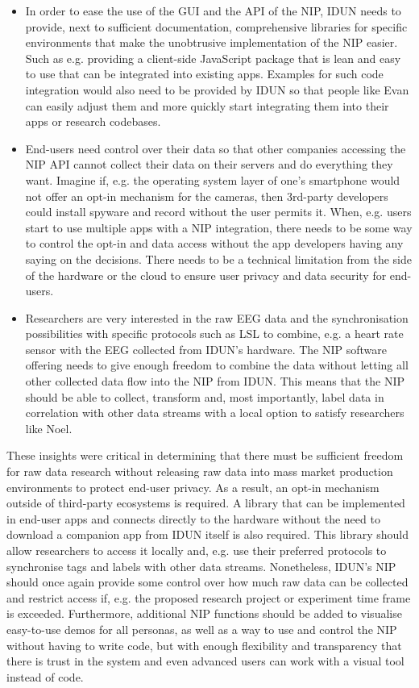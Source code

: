 \begin{itemize}
  \item In order to ease the use of the GUI and the API of the NIP, IDUN needs to provide, next to sufficient documentation, comprehensive libraries for specific environments that make the unobtrusive implementation of the NIP easier. Such as e.g. providing a client-side JavaScript package that is lean and easy to use that can be integrated into existing apps. Examples for such code integration would also need to be provided by IDUN so that people like Evan can easily adjust them and more quickly start integrating them into their apps or research codebases.
  \item End-users need control over their data so that other companies accessing the NIP API cannot collect their data on their servers and do everything they want. Imagine if, e.g. the operating system layer of one's smartphone would not offer an opt-in mechanism for the cameras, then 3rd-party developers could install spyware and record without the user permits it. When, e.g. users start to use multiple apps with a NIP integration, there needs to be some way to control the opt-in and data access without the app developers having any saying on the decisions. There needs to be a technical limitation from the side of the hardware or the cloud to ensure user privacy and data security for end-users.
  \item Researchers are very interested in the raw EEG data and the synchronisation possibilities with specific protocols such as LSL to combine, e.g. a heart rate sensor with the EEG collected from IDUN's hardware. The NIP software offering needs to give enough freedom to combine the data without letting all other collected data flow into the NIP from IDUN. This means that the NIP should be able to collect, transform and, most importantly, label data in correlation with other data streams with a local option to satisfy researchers like Noel.
\end{itemize}

These insights were critical in determining that there must be sufficient freedom for raw data research without releasing raw data into mass market production environments to protect end-user privacy. As a result, an opt-in mechanism outside of third-party ecosystems is required. A library that can be implemented in end-user apps and connects directly to the hardware without the need to download a companion app from IDUN itself is also required. This library should allow researchers to access it locally and, e.g. use their preferred protocols to synchronise tags and labels with other data streams. Nonetheless, IDUN's NIP should once again provide some control over how much raw data can be collected and restrict access if, e.g. the proposed research project or experiment time frame is exceeded. Furthermore, additional NIP functions should be added to visualise easy-to-use demos for all personas, as well as a way to use and control the NIP without having to write code, but with enough flexibility and transparency that there is trust in the system and even advanced users can work with a visual tool instead of code.

